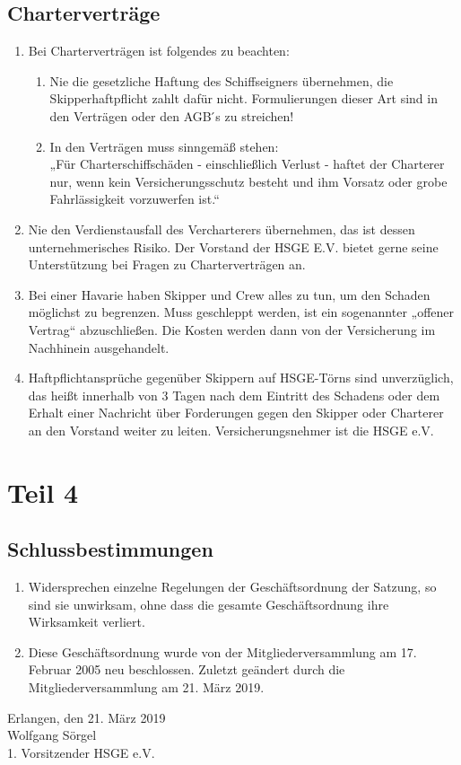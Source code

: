 \documentclass[10pt, twocolumn, parskip=half]{scrartcl}
\begin{document}
\subsection{Charterverträge}
\begin{enumerate}[noitemsep]
	\item Bei Charterverträgen ist folgendes zu beachten:
		\begin{enumerate}[noitemsep]
		\item Nie die gesetzliche Haftung des Schiffseigners übernehmen, die Skipperhaftpflicht
			zahlt dafür nicht. Formulierungen dieser Art sind in den Verträgen oder den AGB ́s zu
			streichen!
			\item In den Verträgen muss sinngemäß stehen:\\
				„Für Charterschiffschäden - einschließlich Verlust - haftet der Charterer nur, wenn
			kein Versicherungsschutz besteht und ihm Vorsatz oder grobe Fahrlässigkeit
			vorzuwerfen ist.“
		\end{enumerate}
	\item Nie den Verdienstausfall des Vercharterers übernehmen, das ist dessen unternehmerisches
	Risiko. Der Vorstand der HSGE E.V. bietet gerne seine Unterstützung bei Fragen zu
	Charterverträgen an.
	\item Bei einer Havarie haben Skipper und Crew alles zu tun, um den Schaden möglichst zu
	begrenzen. Muss geschleppt werden, ist ein sogenannter „offener Vertrag“ abzuschließen. Die
	Kosten werden dann von der Versicherung im Nachhinein ausgehandelt.
	\item Haftpflichtansprüche gegenüber Skippern auf HSGE-Törns sind unverzüglich, das heißt
	innerhalb von 3 Tagen nach dem Eintritt des Schadens oder dem Erhalt einer Nachricht über
	Forderungen gegen den Skipper oder Charterer an den Vorstand weiter zu leiten.
	Versicherungsnehmer ist die HSGE e.V.
\end{enumerate}

\section*{Teil 4}
\setcounter{subsection}{0}

\subsection{Schlussbestimmungen}
\begin{enumerate}[noitemsep]
	\item Widersprechen einzelne Regelungen der Geschäftsordnung der Satzung, so sind sie
	unwirksam, ohne dass die gesamte Geschäftsordnung ihre Wirksamkeit verliert.
	\item Diese Geschäftsordnung wurde von der Mitgliederversammlung am 17. Februar 2005 neu
	beschlossen. Zuletzt geändert durch die Mitgliederversammlung am 21. März 2019.
\end{enumerate}
\begin{flushright}
	Erlangen, den 21. März 2019\\
	\vspace{1cm}
	Wolfgang Sörgel\\
	1. Vorsitzender HSGE e.V.\\
	
\end{flushright}
\end{document}
